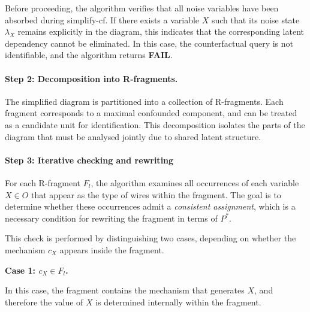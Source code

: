 \documentclass[a4paper]{report}
\begin{document}
Before proceeding, the algorithm verifies that all noise variables have been absorbed during simplify-cf.   If there exists a variable $X$ such that its noise state $\lambda_X$ remains explicitly in the diagram, this indicates that the corresponding latent dependency cannot be eliminated. In this case, the counterfactual query is not identifiable, and the algorithm returns \textbf{FAIL}.

\paragraph{Step 2: Decomposition into R-fragments.}  The simplified diagram is partitioned into a collection of R-fragments. Each fragment corresponds to a maximal confounded component, and can be treated as a candidate unit for identification.  This decomposition isolates the parts of the diagram that must be analysed jointly due to shared latent structure.

\paragraph{Step 3: Iterative checking and rewriting}

For each R-fragment $F_l$, the algorithm examines all occurrences of each variable $X \in O$ that appear as the type of wires within the fragment. The goal is to determine whether these occurrences admit a \emph{consistent assignment}, which is a necessary condition for rewriting the fragment in terms of $P^*$.

This check is performed by distinguishing two cases, depending on whether the mechanism $c_X$ appears inside the fragment.

\medskip

\textbf{Case 1: $c_X \in F_l$.}

In this case, the fragment contains the mechanism that generates $X$, and therefore the value of $X$ is determined internally within the fragment.
\end{document}
